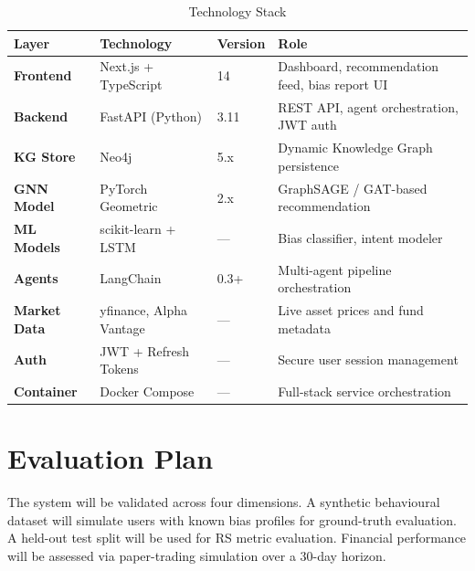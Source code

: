 \documentclass[12pt, a4paper]{article}
\begin{document}
\begin{table}[H]
\centering
\caption{Technology Stack}
\renewcommand{\arraystretch}{1.4}
\begin{tabularx}{\textwidth}{>{\bfseries}lllX}
\toprule
\textbf{Layer} & \textbf{Technology} & \textbf{Version} & \textbf{Role} \\
\midrule
Frontend   & Next.js + TypeScript & 14      & Dashboard, recommendation feed, bias report UI \\
Backend    & FastAPI (Python)     & 3.11    & REST API, agent orchestration, JWT auth \\
KG Store   & Neo4j                & 5.x     & Dynamic Knowledge Graph persistence \\
GNN Model  & PyTorch Geometric    & 2.x     & GraphSAGE / GAT-based recommendation \\
ML Models  & scikit-learn + LSTM  & ---     & Bias classifier, intent modeler \\
Agents     & LangChain            & 0.3+    & Multi-agent pipeline orchestration \\
Market Data& yfinance, Alpha Vantage & ---  & Live asset prices and fund metadata \\
Auth       & JWT + Refresh Tokens & ---     & Secure user session management \\
Container  & Docker Compose       & ---     & Full-stack service orchestration \\
\bottomrule
\end{tabularx}
\end{table}

\section{Evaluation Plan}

The system will be validated across four dimensions. A synthetic behavioural dataset will
simulate users with known bias profiles for ground-truth evaluation. A held-out test
split will be used for RS metric evaluation. Financial performance will be assessed via
paper-trading simulation over a 30-day horizon.
\end{document}
